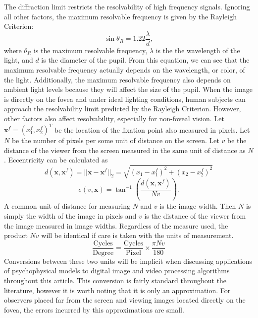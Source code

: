 \documentclass{article}
\begin{document}
The diffraction limit restricts the resolvability of high frequency signals. 
Ignoring all other factors, the maximum resolvable frequency is given by the Rayleigh Criterion:
\begin{equation}
\sin \theta_R = 1.22 \frac{\lambda}{d},
\end{equation}
where $\theta_R$ is the maximum resolvable frequency, $\lambda$ is the the wavelength of the light, and $d$ is the diameter of the pupil. 
From this equation, we can see that the maximum resolvable frequency actually depends on the wavelength, or color, of the light.
Additionally, the maximum resolvable frequency also depends on ambient light levels because they will affect the size of the pupil. 
When the image is directly on the fovea and under ideal lighting conditions, human subjects can approach the resolvability limit predicted by the Rayleigh Criterion.
However, other factors also affect resolvability, especially for non-foveal vision.
Let $\mathbf{x}^f = (x_1^f, x_2^f)^T$ be the location of the fixation point also measured in pixels.
Let $N$ be the number of pixels per some unit of distance on the screen.
Let $v$ be the distance of the viewer from the screen measured in the same unit of distance as $N$.
Eccentricity can be calculated as
\begin{equation}
\label{fovealdistance}
d( \mathbf{x}, \mathbf{x}^f ) = || \mathbf{x} - \mathbf{x}^f ||_2 = \sqrt{ (x_1 - x_1^f)^2 + (x_2 - x_2^f)^2 }
\end{equation}
\begin{equation}
\label{eccentricityeqn}
e(v,\mathbf{x}) = \tan^{-1}\left( \frac{ d(\mathbf{x}, \mathbf{x}^f ) }{ Nv } \right).
\end{equation}
A common unit of distance for measuring $N$ and $v$ is the image width.
Then $N$ is simply the width of the image in pixels and $v$ is the distance of the viewer from the image measured in image widths.
Regardless of the measure used, the product $Nv$ will be identical if care is taken with the units of measurement.
\begin{equation}
\frac{ \mbox{Cycles} }{ \mbox{Degree} } = \frac{ \mbox{Cycles} }{ \mbox{Pixel} } \times \frac{\pi N v}{180}
\end{equation}
Conversions between these two units will be implicit when discussing applications of psychophysical models to digital image and video processing algorithms throughout this article.
This conversion is fairly standard throughout the literature, however it is worth noting that it is only an approximation.
For observers placed far from the screen and viewing images located directly on the fovea, the errors incurred by this approximations are small.
\end{document}
